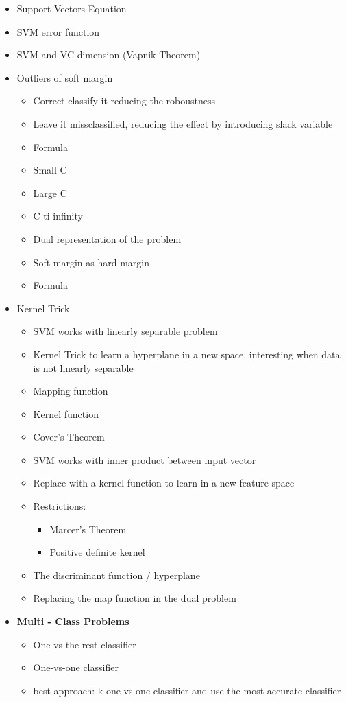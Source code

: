 \begin{itemize}
    \item Support Vectors Equation
    \item SVM error function
    \item SVM and VC dimension (Vapnik Theorem)
    \item Outliers of soft margin
    \begin{itemize}
        \item Correct classify it reducing the roboustness
        \item Leave it missclassified, reducing the effect by introducing slack variable
        \item Formula
        \item Small C
        \item Large C
        \item C ti infinity
        \item Dual representation of the problem
        \item Soft margin as hard margin
        \item Formula
    \end{itemize}
    \item Kernel Trick
    \begin{itemize}
        \item SVM works with linearly separable problem
        \item Kernel Trick to learn a hyperplane in a new space, interesting when data is not linearly separable
        \item Mapping function
        \item Kernel function
        \item Cover's Theorem
        \item SVM works with inner product between input vector
        \item Replace with a kernel function to learn in a new feature space
        \item Restrictions:
        \begin{itemize}
            \item Marcer's Theorem
            \item Positive definite kernel
        \end{itemize}
        \item The discriminant function / hyperplane
        \item Replacing the map function in the dual problem
    \end{itemize}
    \item \textbf{Multi - Class Problems}
    \begin{itemize}
        \item One-vs-the rest classifier
        \item One-vs-one classifier
        \item best approach: k one-vs-one classifier and use the most accurate classifier 
    \end{itemize}
\end{itemize}

